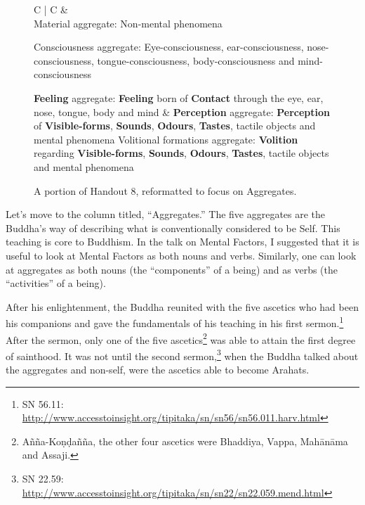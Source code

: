 \begin{figure}[H]
\begin{tabular*}{\textwidth}{C{\tabcolsep} | C{\tabcolsep}}
\toprule
{} &  \\
\midrule
Material aggregate:\newline
 Non-mental phenomena\newline\vspace{5mm}
 
 Consciousness aggregate:\newline
 Eye-consciousness, ear-consciousness, nose-consciousness, tongue-consciousness, body-consciousness and mind-consciousness\newline\vspace{5mm}
 
 \textbf{Feeling} aggregate:\newline
 \textbf{Feeling} born of \textbf{Contact} through the eye, ear, nose, tongue, body and mind
 &
 \textbf{Perception} aggregate:\newline
 \textbf{Perception} of \textbf{Visible-forms}, \textbf{Sounds}, \textbf{Odours}, \textbf{Tastes}, tactile objects and mental phenomena
 \newline\vspace{5mm}
 Volitional formations aggregate:\newline
 \textbf{Volition} regarding \textbf{Visible-forms}, \textbf{Sounds}, \textbf{Odours}, \textbf{Tastes}, tactile objects and mental phenomena
 \\
 
\bottomrule
\end{tabular*}
\caption{A portion of Handout 8, reformatted to focus on Aggregates.}
\end{figure}

Let’s move to the column titled, “Aggregates.” The five aggregates are the Buddha’s way of describing what is conventionally considered to be Self. This teaching is core to Buddhism. In the talk on Mental Factors, I suggested that it is useful to look at Mental Factors as both nouns and verbs. Similarly, one can look at aggregates as both nouns (the “components” of a being) and as verbs (the “activities” of a being).

After his enlightenment, the Buddha reunited with the five ascetics who had been his companions and gave the fundamentals of his teaching in his first sermon.\footnote{SN 56.11: \url{http://www.accesstoinsight.org/tipitaka/sn/sn56/sn56.011.harv.html}} After the sermon, only one of the five ascetics\footnote{Añña-Koṇḍañña, the other four ascetics were Bhaddiya, Vappa, Mahānāma and Assaji.} was able to attain the first degree of sainthood. It was not until the second sermon,\footnote{SN 22.59: \url{http://www.accesstoinsight.org/tipitaka/sn/sn22/sn22.059.mend.html}} when the Buddha talked about the aggregates and non-self, were the ascetics able to become Arahats.

